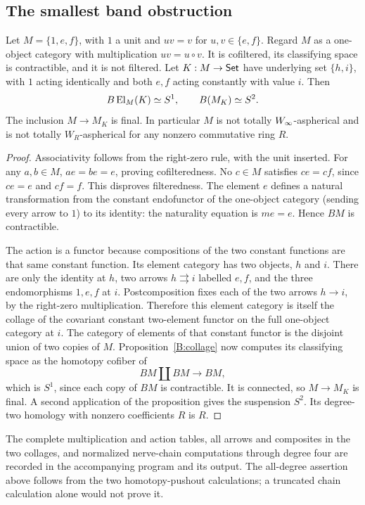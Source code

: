 \subsection{The smallest band obstruction}

\begin{proposition}\label{B:right-zero}
Let $M=\{1,e,f\}$, with $1$ a unit and $uv=v$ for $u,v\in\{e,f\}$. Regard $M$ as a one-object category with multiplication $uv=u\circ v$. It is cofiltered, its classifying space is contractible, and it is not filtered. Let $K:M\to\mathsf{Set}$ have underlying set $\{h,i\}$, with $1$ acting identically and both $e,f$ acting constantly with value $i$. Then
\[
 B\operatorname{El}_M(K)\simeq S^1,
 \qquad B(M_K)\simeq S^2.
\]
The inclusion $M\to M_K$ is final. In particular $M$ is not totally $W_{\infty}$-aspherical and is not totally $W_R$-aspherical for any nonzero commutative ring $R$.
\end{proposition}

\begin{proof}
Associativity follows from the right-zero rule, with the unit inserted. For any $a,b\in M$, $ae=be=e$, proving cofilteredness. No $c\in M$ satisfies $ce=cf$, since $ce=e$ and $cf=f$. This disproves filteredness. The element $e$ defines a natural transformation from the constant endofunctor of the one-object category (sending every arrow to $1$) to its identity: the naturality equation is $me=e$. Hence $BM$ is contractible.

The action is a functor because compositions of the two constant functions are that same constant function. Its element category has two objects, $h$ and $i$. There are only the identity at $h$, two arrows $h\rightrightarrows i$ labelled $e,f$, and the three endomorphisms $1,e,f$ at $i$. Postcomposition fixes each of the two arrows $h\to i$, by the right-zero multiplication. Therefore this element category is itself the collage of the covariant constant two-element functor on the full one-object category at $i$. The category of elements of that constant functor is the disjoint union of two copies of $M$. Proposition~\ref{B:collage} now computes its classifying space as the homotopy cofiber of
\[
 BM\amalg BM\longrightarrow BM,
\]
which is $S^1$, since each copy of $BM$ is contractible. It is connected, so $M\to M_K$ is final. A second application of the proposition gives the suspension $S^2$. Its degree-two homology with nonzero coefficients $R$ is $R$.
\end{proof}

The complete multiplication and action tables, all arrows and composites in the two collages, and normalized nerve-chain computations through degree four are recorded in the accompanying program  and its output. The all-degree assertion above follows from the two homotopy-pushout calculations; a truncated chain calculation alone would not prove it.

